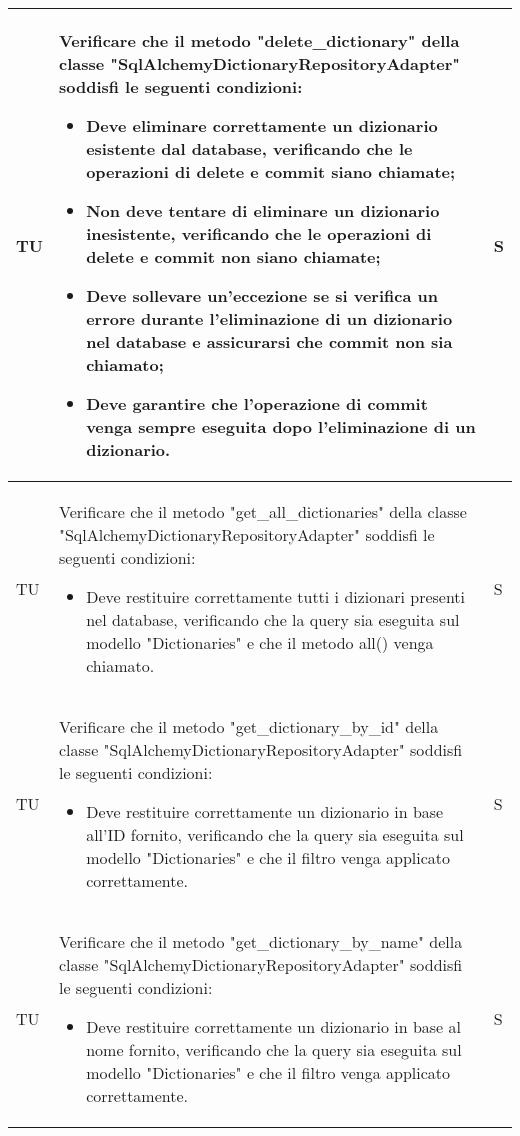 \begin{adjustwidth}{-0.5cm}{-0.5cm}
\begin{longtable}{|P{1.5cm}|>{\raggedright}P{9.5cm}|>{\arraybackslash}P{1.5cm}|}
		\hline TU & Verificare che il metodo "delete\_dictionary" della classe "SqlAlchemyDictionaryRepositoryAdapter" soddisfi le seguenti condizioni:
		\begin{itemize}
			\item Deve eliminare correttamente un dizionario esistente dal database, verificando che le operazioni di delete e commit siano chiamate;
			\item Non deve tentare di eliminare un dizionario inesistente, verificando che le operazioni di delete e commit non siano chiamate;
			\item Deve sollevare un'eccezione se si verifica un errore durante l'eliminazione di un dizionario nel database e assicurarsi che commit non sia chiamato;
			\item Deve garantire che l'operazione di commit venga sempre eseguita dopo l'eliminazione di un dizionario.
		\end{itemize} & S \\

		\hline TU & Verificare che il metodo "get\_all\_dictionaries" della classe "SqlAlchemyDictionaryRepositoryAdapter" soddisfi le seguenti condizioni:
		\begin{itemize}
			\item Deve restituire correttamente tutti i dizionari presenti nel database, verificando che la query sia eseguita sul modello "Dictionaries" e che il metodo all() venga chiamato.
		\end{itemize} & S \\

		\hline TU & Verificare che il metodo "get\_dictionary\_by\_id" della classe "SqlAlchemyDictionaryRepositoryAdapter" soddisfi le seguenti condizioni:
		\begin{itemize}
			\item Deve restituire correttamente un dizionario in base all'ID fornito, verificando che la query sia eseguita sul modello "Dictionaries" e che il filtro venga applicato correttamente.
		\end{itemize} & S \\

		\hline TU & Verificare che il metodo "get\_dictionary\_by\_name" della classe "SqlAlchemyDictionaryRepositoryAdapter" soddisfi le seguenti condizioni:
		\begin{itemize}
			\item Deve restituire correttamente un dizionario in base al nome fornito, verificando che la query sia eseguita sul modello "Dictionaries" e che il filtro venga applicato correttamente.
		\end{itemize} & S \\


\end{longtable}
\end{adjustwidth}
